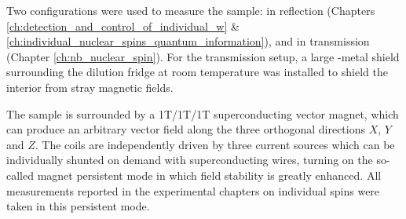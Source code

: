 
Two configurations were used to measure the sample: in reflection (Chapters \ref{ch:detection_and_control_of_individual_w} \& \ref{ch:individual_nuclear_spins_quantum_information}), and in transmission (Chapter \ref{ch:nb_nuclear_spin}). For the transmission setup, a large \textmu-metal shield surrounding the dilution fridge at room temperature was installed to shield the interior from stray magnetic fields.


The sample is surrounded by a 1T/1T/1T superconducting vector magnet, which can produce an arbitrary vector field along the three orthogonal directions $X$, $Y$ and $Z$. The coils are independently driven by three current sources which can be individually shunted on demand with superconducting wires, turning on the so-called magnet persistent mode in which field stability is greatly enhanced. All measurements reported in the experimental chapters on individual spins were taken in this persistent mode. %

